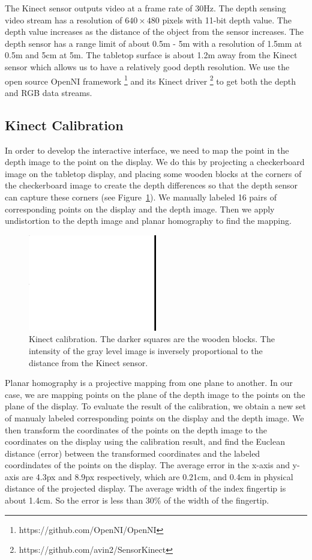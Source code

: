 The Kinect sensor outputs video at a frame rate of 30Hz. The depth sensing video
stream has a resolution of $640\times 480$ pixels with 11-bit depth value. The
depth value increases as the distance of the object from the sensor increases.
The depth sensor has a range limit of about 0.5m - 5m with a resolution of 1.5mm
at 0.5m and 5cm at 5m. The tabletop surface is about 1.2m away from the Kinect
sensor which allows us to have a relatively good depth resolution. We use the
open source OpenNI framework \footnote{https://github.com/OpenNI/OpenNI} and its
Kinect driver \footnote{https://github.com/avin2/SensorKinect} to get both the depth and RGB data streams.

\subsection{Kinect Calibration}
In order to develop the interactive interface, we need to map the point in the
depth image to the point on the display. We do this by projecting a
checkerboard image on the tabletop display, and placing some wooden blocks at
the corners of the checkerboard image to create the depth differences so that 
the depth sensor can capture these corners (see Figure~\ref{fig:calibration}).
We manually labeled 16 pairs of corresponding points on the display and the depth image. Then we
apply undistortion to the depth image and planar homography to find the mapping.

\begin{figure}[h]
  \centering
  \includegraphics[width=0.5\textwidth]{figures/calibration.png} 
  \caption{Kinect calibration. The darker squares are the wooden blocks. The
  intensity of the gray level image is inversely proportional to the distance
  from the Kinect sensor.}
  \label{fig:calibration}
\end{figure}

Planar homography is a projective mapping from one plane to another. In our
case, we are mapping points on the plane of the depth image to the points
on the plane of the display. To evaluate the result of the calibration, we
obtain a new set of manualy labeled corresponding points on the display and the
depth image. We then transform the coordinates of the points on the depth image
to the coordinates on the display using the calibration result, and find the
Euclean distance (error) between the transformed coordinates and the labeled
coordindates of the points on the display. The average error in the x-axis and
y-axis are 4.3px and 8.9px respectively, which are 0.21cm, and 0.4cm in physical distance of the
projected display. The average width of the index fingertip is about 1.4cm. So
the error is less than 30\% of the width of the fingertip. 

